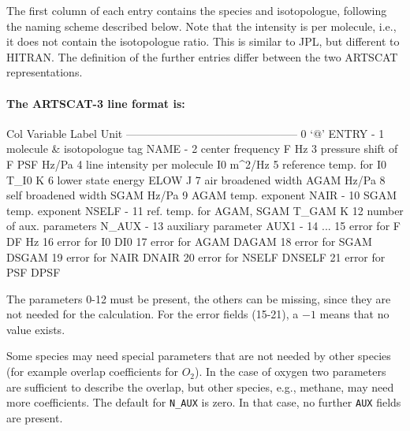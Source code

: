 The first column of each entry contains the species and isotopologue,
following the naming scheme described below. Note that the intensity
is per molecule, i.e., it does not contain the isotopologue ratio. This is
similar to JPL, but different to HITRAN.
The definition of the further entries differ between the two ARTSCAT
representations.

\paragraph*{The ARTSCAT-3 line format is:}
\begin{code}

Col  Variable                     Label    Unit     
-----------------------------------------------      
 0   `@'                         ENTRY        -     
 1   molecule & isotopologue tag  NAME        -
 2   center frequency                F       Hz     
 3   pressure shift of F           PSF    Hz/Pa    
 4   line intensity per molecule    I0   m^2/Hz     
 5   reference temp. for I0       T_I0        K
 6   lower state energy           ELOW        J    
 7   air broadened width          AGAM    Hz/Pa     
 8   self broadened width         SGAM    Hz/Pa
 9   AGAM temp. exponent          NAIR        -     
10   SGAM temp. exponent         NSELF        - 
11   ref. temp. for AGAM, SGAM   T_GAM        K
12   number of aux. parameters   N_AUX        -
13   auxiliary parameter          AUX1        -
14   ... 
15   error for F                    DF       Hz
16   error for I0                  DI0        %
17   error for AGAM              DAGAM        %
18   error for SGAM              DSGAM        %
19   error for NAIR              DNAIR        %
20   error for NSELF            DNSELF        %
21   error for PSF                DPSF        %

\end{code}
The parameters 0-12 must be present, the others can be missing, since
they are not needed for the calculation. For the error fields (15-21),
a $-1$ means that no value exists.

Some species may need special parameters that are not needed by other
species (for example overlap coefficients for $O_2$). In the case of
oxygen two parameters are sufficient to describe the overlap, but
other species, e.g., methane, may need more coefficients. The default
for \texttt{N\_AUX} is zero. In that case, no further \texttt{AUX}
fields are present.


